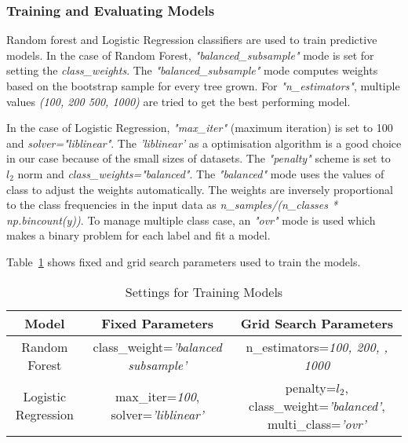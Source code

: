 \documentclass[english]{tktltiki2}
\theoremstyle{definition}
\theoremstyle{remark}
\begin{document}
\subsubsection{Training and Evaluating Models}
Random forest and Logistic Regression classifiers are used to train predictive models. In the case of Random Forest, \textit{"balanced\_subsample"} mode is set for setting the \textit{class\_weights}. The \textit{"balanced\_subsample"} mode computes weights based on the bootstrap sample for every tree grown. For \textit{"n\_estimators"}, multiple values \textit{(100, 200 500, 1000)} are tried to get the best performing model.

In the case of Logistic Regression, \textit{"max\_iter"} (maximum iteration) is set to 100 and \textit{solver="liblinear"}. The \textit{'liblinear'} as a optimisation algorithm is a good choice in our case because of the small sizes of datasets. The \textit{"penalty"} scheme is set to $l_2$ norm and \textit{class\_weights="balanced"}. The \textit{"balanced"} mode uses the values of class to adjust the weights automatically. The weights are inversely proportional to the class frequencies in the input data as  \textit{n\_samples/(n\_classes * np.bincount(y))}. To manage multiple class case, an \textit{"ovr"} mode is used which makes a binary problem for each label and fit a model. 

Table~\ref{table:training_models_datasets_UCI} shows fixed and grid search parameters used to train the models.


\begin{table}[H]
	\caption{Settings for Training Models}
	\label{table:training_models_datasets_UCI}
	\begin{center}
		\begin{tabular}{@{}ccc@{}}
			\toprule
			Model & Fixed Parameters & Grid Search Parameters \\ \hline

			\multicolumn{1}{|c|}{Random Forest} & \multicolumn{1}{p{40mm}|}{class\_weight=\textit{'balanced \newline subsample'}} & \multicolumn{1}{p{40mm}|}{n\_estimators=\textit{100, 200, \newline 500, 1000}} \\ \hline

			\multicolumn{1}{|c|}{Logistic Regression} & \multicolumn{1}{p{40mm}|}{max\_iter=\textit{100}, \newline solver=\textit{'liblinear'}} & \multicolumn{1}{p{40mm}|}{penalty=\textit{$l_2$},
			\newline class\_weight=\textit{'balanced'},
			\newline multi\_class=\textit{'ovr'}} \\ \hline
			

		\end{tabular}
	\end{center}
\end{table}
\end{document}
